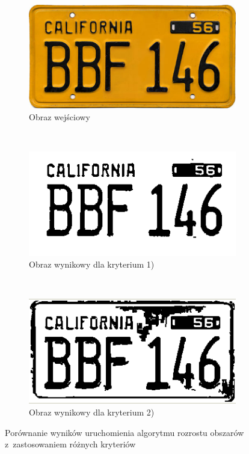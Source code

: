 \begin{figure}
  \centering
  \begin{subfigure}[b]{0.45\textwidth}
    \includegraphics[width=\textwidth]{img/region-growing-input}
    \caption{Obraz wejściowy}
    \label{fig:region_growing_input}
  \end{subfigure}
  ~
  \begin{subfigure}[b]{0.45\textwidth}
    \includegraphics[width=\textwidth]{img/region-growing-relative}
    \caption{Obraz wynikowy dla kryterium 1)}
    \label{fig:region_growing_relative}
  \end{subfigure}
  ~
  \begin{subfigure}[b]{0.45\textwidth}
    \includegraphics[width=\textwidth]{img/region-growing-absolute}
    \caption{Obraz wynikowy dla kryterium 2)}
    \label{fig:region_growing_absolute}
  \end{subfigure}
  \caption{Porównanie wyników uruchomienia algorytmu rozrostu obszarów z~zastosowaniem różnych kryteriów}
    \label{fig:region_growing}
\end{figure}

